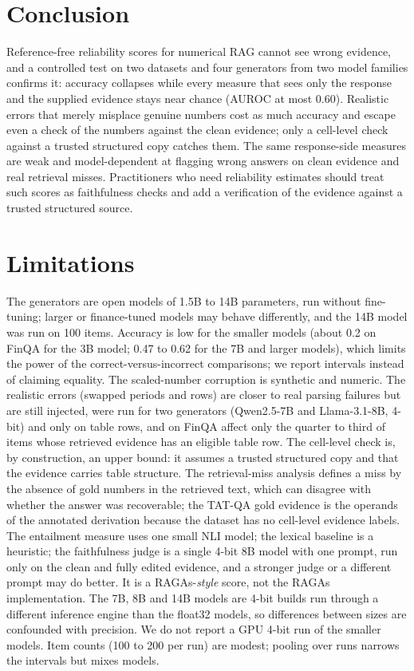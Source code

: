 \section{Conclusion}

Reference-free reliability scores for numerical RAG cannot see wrong evidence, and a controlled test on two datasets and four generators from two model families confirms it: accuracy collapses while every measure that sees only the response and the supplied evidence stays near chance (AUROC at most 0.60).
Realistic errors that merely misplace genuine numbers cost as much accuracy and escape even a check of the numbers against the clean evidence; only a cell-level check against a trusted structured copy catches them.
The same response-side measures are weak and model-dependent at flagging wrong answers on clean evidence and real retrieval misses.
Practitioners who need reliability estimates should treat such scores as faithfulness checks and add a verification of the evidence against a trusted structured source.

\section*{Limitations}

The generators are open models of 1.5B to 14B parameters, run without fine-tuning; larger or finance-tuned models may behave differently, and the 14B model was run on 100 items.
Accuracy is low for the smaller models (about 0.2 on FinQA for the 3B model; 0.47 to 0.62 for the 7B and larger models), which limits the power of the correct-versus-incorrect comparisons; we report intervals instead of claiming equality.
The scaled-number corruption is synthetic and numeric. The realistic errors (swapped periods and rows) are closer to real parsing failures but are still injected, were run for two generators (Qwen2.5-7B and Llama-3.1-8B, 4-bit) and only on table rows, and on FinQA affect only the quarter to third of items whose retrieved evidence has an eligible table row.
The cell-level check is, by construction, an upper bound: it assumes a trusted structured copy and that the evidence carries table structure.
The retrieval-miss analysis defines a miss by the absence of gold numbers in the retrieved text, which can disagree with whether the answer was recoverable; the TAT-QA gold evidence is the operands of the annotated derivation because the dataset has no cell-level evidence labels.
The entailment measure uses one small NLI model; the lexical baseline is a heuristic; the faithfulness judge is a single 4-bit 8B model with one prompt, run only on the clean and fully edited evidence, and a stronger judge or a different prompt may do better. It is a RAGAs-\emph{style} score, not the RAGAs implementation.
The 7B, 8B and 14B models are 4-bit builds run through a different inference engine than the float32 models, so differences between sizes are confounded with precision.
We do not report a GPU 4-bit run of the smaller models.
Item counts (100 to 200 per run) are modest; pooling over runs narrows the intervals but mixes models.

